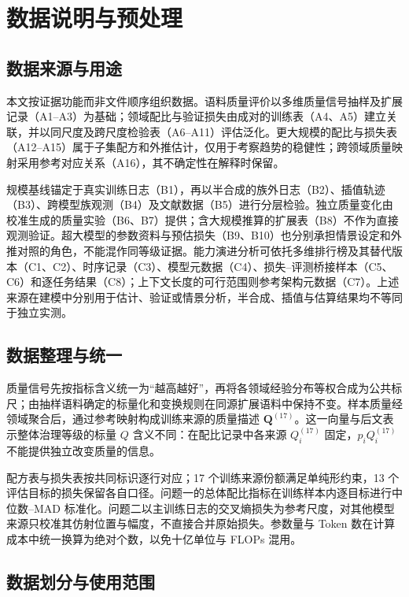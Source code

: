 \documentclass[bwprint]{gmcmthesis}
\begin{document}
\section{数据说明与预处理}

\subsection{数据来源与用途}

本文按证据功能而非文件顺序组织数据。语料质量评价以多维质量信号抽样及扩展记录（A1--A3）为基础；领域配比与验证损失由成对的训练表（A4、A5）建立关联，并以同尺度及跨尺度检验表（A6--A11）评估泛化。更大规模的配比与损失表（A12--A15）属于子集配方和外推估计，仅用于考察趋势的稳健性；跨领域质量映射采用参考对应关系（A16），其不确定性在解释时保留。

规模基线锚定于真实训练日志（B1），再以半合成的族外日志（B2）、插值轨迹（B3）、跨模型族观测（B4）及文献数据（B5）进行分层检验。独立质量变化由校准生成的质量实验（B6、B7）提供；含大规模推算的扩展表（B8）不作为直接观测验证。超大模型的参数资料与预估损失（B9、B10）也分别承担情景设定和外推对照的角色，不能混作同等级证据。能力演进分析可依托多维排行榜及其替代版本（C1、C2）、时序记录（C3）、模型元数据（C4）、损失--评测桥接样本（C5、C6）和逐任务结果（C8）；上下文长度的可行范围则参考架构元数据（C7）。上述来源在建模中分别用于估计、验证或情景分析，半合成、插值与估算结果均不等同于独立实测。

\subsection{数据整理与统一}

质量信号先按指标含义统一为“越高越好”，再将各领域经验分布等权合成为公共标尺；由抽样语料确定的标量化和变换规则在同源扩展语料中保持不变。样本质量经领域聚合后，通过参考映射构成训练来源的质量描述 $\mathbf Q^{(17)}$。这一向量与后文表示整体治理等级的标量 $Q$ 含义不同：在配比记录中各来源 $Q_i^{(17)}$ 固定，$p_iQ_i^{(17)}$ 不能提供独立改变质量的信息。

配方表与损失表按共同标识逐行对应；17 个训练来源份额满足单纯形约束，13 个评估目标的损失保留各自口径。问题一的总体配比指标在训练样本内逐目标进行中位数--MAD 标准化。问题二以主训练日志的交叉熵损失为参考尺度，对其他模型来源只校准其仿射位置与幅度，不直接合并原始损失。参数量与 Token 数在计算成本中统一换算为绝对个数，以免十亿单位与 FLOPs 混用。

\subsection{数据划分与使用范围}
\end{document}
